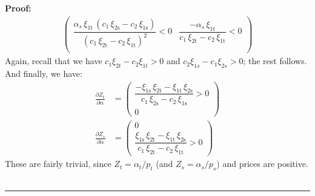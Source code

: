 \documentclass[11pt,a4paper,leqno]{extarticle}
\newenvironment{proof}[1][Proof]{\noindent\textbf{#1:} }{\ \rule{0.5em}{0.5em}}
\begin{document}
\begin{proof}
\begin{align*}
\begin{pmatrix}
		\dfrac{\alpha _{s}\,\xi _{\mathrm{1t}}\,\left(c_{1}\,\xi _{\mathrm{2s}}-c_{2}\,\xi _{\mathrm{1s}}\right)}{{\left(c_{1}\,\xi _{\mathrm{2t}}-c_{2}\,\xi _{\mathrm{1t}}\right)}^2} < 0& \dfrac{-\alpha _{s}\,\xi _{\mathrm{1t}}}{c_{1}\,\xi _{\mathrm{2t}}-c_{2}\,\xi _{\mathrm{1t}}} <0\\
		\end{pmatrix}
		\end{align*}
		Again, recall that we have $c_1 \xi_{2t} - c_2 \xi_{1t} > 0$ and $c_2 \xi_{1s} - c_1 \xi_{2s} > 0$; the rest follows. And finally, we have:
		\begin{align*}
		\frac{\partial Z_t}{\partial \alpha} &= 
		\begin{pmatrix}
		\dfrac{-\xi _{\mathrm{1s}}\,\xi _{\mathrm{2t}}-\xi _{\mathrm{1t}}\,\xi _{\mathrm{2s}}}{c_{1}\,\xi _{\mathrm{2s}}-c_{2}\,\xi _{\mathrm{1s}}} > 0  \\
		0
		\end{pmatrix} \\
		\frac{\partial Z_s}{\partial \alpha} &= 
		\begin{pmatrix}
		0 \\
		\dfrac{\xi _{\mathrm{1s}}\,\xi _{\mathrm{2t}}-\xi _{\mathrm{1t}}\,\xi _{\mathrm{2s}}}{c_{1}\,\xi _{\mathrm{2t}}-c_{2}\,\xi _{\mathrm{1t}}} > 0
		\end{pmatrix}
		\end{align*}
		These are fairly trivial, since $Z_t = \alpha_t / p_t$ (and $Z_s = \alpha_s/ p_s$) and prices are positive. \\
		\hfill
	\end{proof}
	
\end{document}
